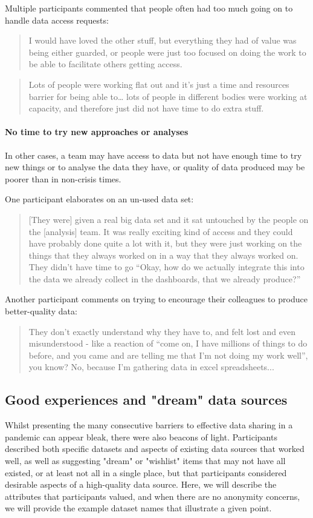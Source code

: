 \documentclass{CUP-JNL-DAP}%
\begin{document}
Multiple participants commented that people often had too much going on to handle data access requests: 

\blockquote{I would have loved the other stuff, but everything they had of value was being either guarded, or people were just too focused on doing the work to be able to facilitate others getting access.}

\blockquote{Lots of people were working flat out and it's just a time and resources barrier for being able to… lots of people in different bodies were working at capacity, and therefore just did not have time to do extra stuff.}

\paragraph{No time to try new approaches or analyses}
In other cases, a team may have access to data but not have enough time to try new things or to analyse the data they have, or quality of data produced may be poorer than in non-crisis times.

One participant elaborates on an un-used data set: 

\blockquote{[They were] given a real big data set and it sat untouched by the people on the [analysis] team. It was really exciting kind of access and they could have probably done quite a lot with it, but they were just working on the things that they always worked on in a way that they always worked on. They didn't have time to go \enquote{Okay, how do we actually integrate this into the data we already collect in the dashboards, that we already produce?}}

Another participant comments on trying to encourage their colleagues to produce better-quality data: 

\blockquote{They don't exactly understand why they have to, and felt lost and even misunderstood - like a reaction of \enquote{come on, I have millions of things to do before, and you came and are telling me that I'm not doing my work well}, you know? No, because I'm gathering data in excel spreadsheets...}

\subsection{Good experiences and "dream" data sources}
Whilst presenting the many consecutive barriers to effective data sharing in a pandemic can appear bleak, there were also beacons of light. Participants described both specific datasets and aspects of existing data sources that worked well, as well as suggesting "dream" or "wishlist" items that may not have all existed, or at least not all in a single place, but that participants considered desirable aspects of a high-quality data source. Here, we will describe the attributes that participants valued,  and when there are no anonymity concerns, we will provide the example dataset names that illustrate a given point. 
\end{document}
